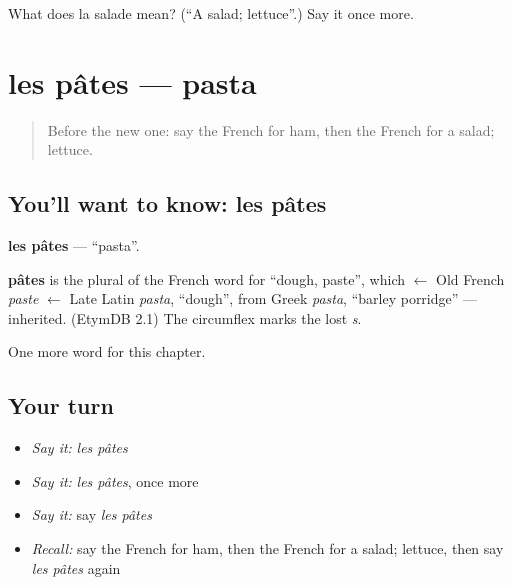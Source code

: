 \begin{tcolorbox}[breakable,colback=teal!4,colframe=teal!35!black,title={Before you move on}]
What does la salade mean? (\textquotedblleft{}A salad; lettuce\textquotedblright{}.) Say it once more.
\end{tcolorbox}
\section[les pâtes]{les pâtes — pasta}

\label{lesson:FR-C72-pates}



\begin{quote}
Before the new one: say the French for ham, then the French for a salad; lettuce.
\end{quote}

\subsection*{You'll want to know: les pâtes}
\textbf{les pâtes} — \textquotedblleft{}pasta\textquotedblright{}.

\begin{cousinweb}
\textbf{pâtes} is the plural of the French word for \textquotedblleft{}dough, paste\textquotedblright{}, which $\leftarrow$ Old French \emph{paste} $\leftarrow$ Late Latin \emph{pasta}, \textquotedblleft{}dough\textquotedblright{}, from Greek \emph{pasta}, \textquotedblleft{}barley porridge\textquotedblright{} — inherited. (EtymDB 2.1) The circumflex marks the lost \emph{s}.
\end{cousinweb}

\begin{grammarlens}[title={What you've built}]
One more word for this chapter.
\end{grammarlens}

\subsection*{Your turn}
\begin{itemize}
\raggedright
  \item \emph{Say it:} \emph{les pâtes}
  \item \emph{Say it:} \emph{les pâtes}, once more
  \item \emph{Say it:} say \emph{les pâtes}
  \item \emph{Recall:} say the French for ham, then the French for a salad; lettuce, then say \emph{les pâtes} again
\end{itemize}

